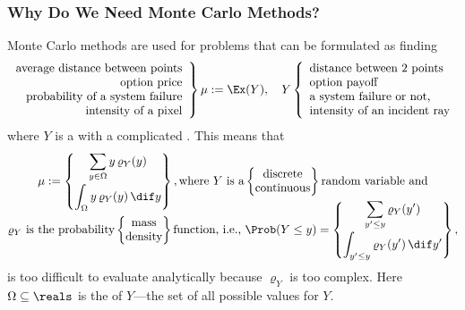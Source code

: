 \documentclass[10pt,compress,xcolor={usenames,dvipsnames}]{beamer} %
\begin{document}
\begin{frame}
\frametitle{Why Do We Need Monte Carlo Methods?}
\vspace{-2ex}
Monte Carlo methods are used for problems that can be formulated as finding 
\[
\left . \begin{array}{r}\text{average distance between points} \\ 
\text{option price} \\ 
\text{probability of a system failure} \\ 
\text{intensity of a pixel} \end{array} \right \}
\mu := \Ex(Y), \quad Y\left \{ \begin{array}{l}\text{distance between 2  points} \\
\text{option payoff} \\ 
\text{a system failure or not, } \\ 
\text{intensity of an incident ray} \end{array} \right .
\]
where $Y$ is a  with a \alert{complicated} .  This means that
\begin{multline*}
\mu := \begin{Bmatrix}\displaystyle
\sum_{y \in \Omega} y \, \varrho_Y(y) \\[3ex]
\displaystyle
\int_{\Omega} y \, \varrho_Y(y) \, \dif y 
\end{Bmatrix},
\text{where $Y$ is a}
\begin{Bmatrix}
\text{discrete} \\
\text{continuous}
\end{Bmatrix}
\text{random variable and} \\[-3ex]
\varrho_Y \text{ is the probability}
\begin{Bmatrix}
\text{mass} \\
\text{density}
\end{Bmatrix}
\text{function, i.e., }\Prob(Y \le y) = 
\begin{Bmatrix}\displaystyle
\sum_{y' \le y} \varrho_Y(y') \\[3ex]
\displaystyle
\int_{y' \le y} \varrho_Y(y') \, \dif y' 
\end{Bmatrix},
\end{multline*}
is too difficult to evaluate analytically because $\varrho_Y$ is too complex.  Here 
$\Omega 
\subseteq \reals$ is the 
  of 
$Y$---the set of all possible values for $Y$.  

\end{frame}
\end{document}
